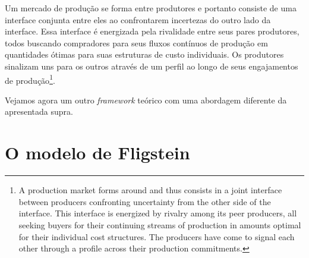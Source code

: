 \documentclass[a4paper, 12pt, openright, oneside, german, french, english, brazil]{abntex2}
\begin{document}
	\begin{citacao}
		Um mercado de produção se forma entre produtores e portanto consiste de uma interface conjunta entre eles ao confrontarem incertezas do outro lado da interface. Essa interface é energizada pela rivalidade entre seus pares produtores, todos buscando compradores para seus fluxos contínuos de produção em quantidades ótimas para suas estruturas de custo individuais. Os produtores sinalizam uns para os outros através de um perfil ao longo de seus engajamentos de produção\footnote{A production market forms around and thus consists in a joint interface between producers confronting uncertainty from the other side of the interface. This interface is energized by rivalry among its peer producers, all seeking buyers for their continuing streams of production in amounts optimal for their individual cost structures. The producers have come to signal each other through a profile across their production commitments.}. \cite[p. 27]{white2002markets}
	\end{citacao}
	

	
	
	
	
	
	
	
	Vejamos agora um outro \textit{framework} teórico com uma abordagem diferente da apresentada supra.
	
	\section{O modelo de Fligstein}
	
\end{document}
